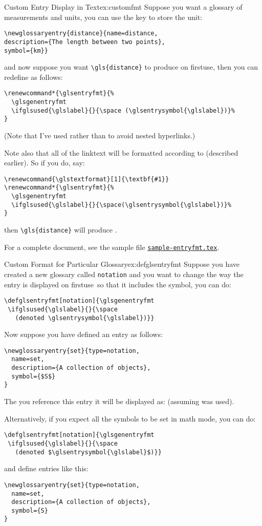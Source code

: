 \documentclass[report,inlinetitle]{nlctdoc}
\newcommand*{\firstuse}{\gls{firstuse}}
\newcommand*{\gloskey}[2][newglossaryentry]{\csopt{#1}{#2}}
\newcounter{sample}
\newcommand*{\samplefile}[2][sample]{%
  \hyperref[ex:#1#2]{\texttt{#1#2.tex}}}
\begin{document}
\begin{example}{Custom Entry Display in Text}{ex:customfmt}
Suppose you want a glossary of measurements and
units, you can use the \gloskey{symbol} key to store the unit:
\begin{verbatim}
\newglossaryentry{distance}{name=distance,
description={The length between two points},
symbol={km}}
\end{verbatim}
and now suppose you want \verb|\gls{distance}| to produce
 on \firstuse, then you can redefine
 as follows:
\begin{verbatim}
\renewcommand*{\glsentryfmt}{%
  \glsgenentryfmt
  \ifglsused{\glslabel}{}{\space (\glsentrysymbol{\glslabel})}%
}
\end{verbatim}

(Note that I've used  rather than 
to avoid nested hyperlinks.)

Note also that all of the \gls{linktext} will be formatted according
to  (described earlier). So if you do, say:
\begin{verbatim}
\renewcommand{\glstextformat}[1]{\textbf{#1}}
\renewcommand*{\glsentryfmt}{%
  \glsgenentryfmt
  \ifglsused{\glslabel}{}{\space(\glsentrysymbol{\glslabel})}%
}
\end{verbatim}
then \verb|\gls{distance}| will produce .

For a complete document, see the sample file \samplefile{-entryfmt}.
\end{example}

\begin{example}{Custom Format for Particular Glossary}{ex:defglsentryfmt}
Suppose you have created a new glossary called
\texttt{notation} and you want to change the way the entry is
displayed on \firstuse\ so that it includes the symbol, you can do:
\begin{verbatim}
\defglsentryfmt[notation]{\glsgenentryfmt
 \ifglsused{\glslabel}{}{\space
   (denoted \glsentrysymbol{\glslabel})}}
\end{verbatim}
Now suppose you have defined an entry as follows:
\begin{verbatim}
\newglossaryentry{set}{type=notation,
  name=set,
  description={A collection of objects},
  symbol={$S$}
}
\end{verbatim}
The  you reference this entry it will be displayed as:
 (assuming  was used).

Alternatively, if you expect all the symbols to be set in math mode,
you can do:
\begin{verbatim}
\defglsentryfmt[notation]{\glsgenentryfmt
 \ifglsused{\glslabel}{}{\space
   (denoted $\glsentrysymbol{\glslabel}$)}}
\end{verbatim}
and define entries like this:
\begin{verbatim}
\newglossaryentry{set}{type=notation,
  name=set,
  description={A collection of objects},
  symbol={S}
}
\end{verbatim}
\end{example}
\end{document}
